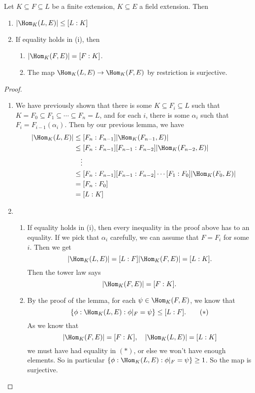\documentclass[a4paper]{article}
\begin{document}
\begin{thm}
  Let $K\subseteq F\subseteq L$ be a finite extension, $K\subseteq E$ a field extension. Then
  \begin{enumerate}
    \item $|\Hom_K(L, E)| \leq [L:K]$
    \item If equality holds in (i), then
      \begin{enumerate}
        \item $|\Hom_K(F, E)| = [F:K]$.
        \item The map $\Hom_K(L, E) \to \Hom_K(F, E)$ by restriction is surjective.
      \end{enumerate}
  \end{enumerate}
\end{thm}

\begin{proof}\leavevmode
  \begin{enumerate}
    \item We have previously shown that there is some $K\subseteq F_i \subseteq L$ such that $K = F_0 \subseteq F_1 \subseteq\cdots \subseteq F_n = L$, and for each $i$, there is some $\alpha_i$ such that $F_i = F_{i - 1}(\alpha_i)$. Then by our previous lemma, we have
      \begin{align*}
        |\Hom_K(L, E)| &\leq [F_n:F_{n - 1}] |\Hom_K(F_{n - 1}, E)|\\
        &\leq [F_n: F_{n - 1}][F_{n - 1}: F_{n - 2}] |\Hom_K(F_{n - 2}, E)|\\
        &\quad \vdots\\
        &\leq [F_n:F_{n - 1}][F_{n - 1}:F_{n - 2}] \cdots [F_1:F_0] |\Hom_K(F_0, E)|\\
        &= [F_n:F_0]\\
        &= [L:K]
      \end{align*}
    \item
    \begin{enumerate}
      \item If equality holds in (i), then every inequality in the proof above has to an equality. If we pick that $\alpha_i$ carefully, we can assume that $F = F_i$ for some $i$. Then we get
        \[
          |\Hom_K(L, E)| = [L:F] |\Hom_K(F, E)| = [L:K].
        \]
        Then the tower law says
        \[
          |\Hom_K(F, E)| = [F:K].
        \]
      \item By the proof of the lemma, for each $\psi \in \Hom_K(F, E)$, we know that
        \[
          \{\phi: \Hom_K(L, E): \phi|_F = \psi\} \leq [L:F].\tag{$*$}
        \]
        As we know that
        \[
          |\Hom_K(F, E)| = [F:K],\quad |\Hom_K(L, E)| = [L:K]
        \]
        we must have had equality in $(*)$, or else we won't have enough elements. So in particular $\{\phi: \Hom_K(L, E): \phi|_F = \psi\} \geq 1$. So the map is surjective.
    \end{enumerate}
  \end{enumerate}
\end{proof}
\end{document}

